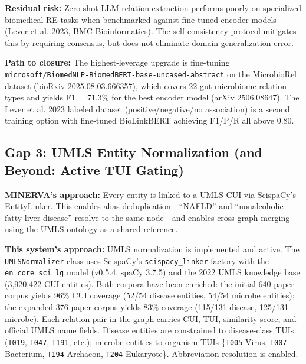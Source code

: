 \documentclass[12pt, letterpaper]{article}
\begin{document}
\textbf{Residual risk:} Zero-shot LLM relation extraction performs poorly on specialized biomedical RE tasks when benchmarked against fine-tuned encoder models (Lever et al. 2023, BMC Bioinformatics). The self-consistency protocol mitigates this by requiring consensus, but does not eliminate domain-generalization error.

\textbf{Path to closure:} The highest-leverage upgrade is fine-tuning \texttt{microsoft/BiomedNLP-BiomedBERT-base-uncased-abstract} on the MicrobioRel dataset (bioRxiv 2025.08.03.666357), which covers 22 gut-microbiome relation types and yields F1 = 71.3\% for the best encoder model (arXiv 2506.08647). The Lever et al. 2023 labeled dataset (positive/negative/no association) is a second training option with fine-tuned BioLinkBERT achieving F1/P/R all above 0.80.

\subsection{Gap 3: UMLS Entity Normalization (and Beyond: Active TUI Gating)}

\textbf{MINERVA's approach:} Every entity is linked to a UMLS CUI via ScispaCy's EntityLinker. This enables alias deduplication—``NAFLD'' and ``nonalcoholic fatty liver disease'' resolve to the same node—and enables cross-graph merging using the UMLS ontology as a shared reference.

\textbf{This system's approach:} UMLS normalization is implemented and active. The \texttt{UMLSNormalizer} class uses ScispaCy's \texttt{scispacy\_linker} factory with the \texttt{en\_core\_sci\_lg} model (v0.5.4, spaCy 3.7.5) and the 2022 UMLS knowledge base (3,920,422 CUI entities). Both corpora have been enriched: the initial 640-paper corpus yields 96\% CUI coverage (52/54 disease entities, 54/54 microbe entities); the expanded 376-paper corpus yields 83\% coverage (115/131 disease, 125/131 microbe). Each relation pair in the graph carries CUI, TUI, similarity score, and official UMLS name fields. Disease entities are constrained to disease-class TUIs (\texttt{T019}, \texttt{T047}, \texttt{T191}, etc.); microbe entities to organism TUIs \{\texttt{T005} Virus, \texttt{T007} Bacterium, \texttt{T194} Archaeon, \texttt{T204} Eukaryote\}. Abbreviation resolution is enabled.
\end{document}
